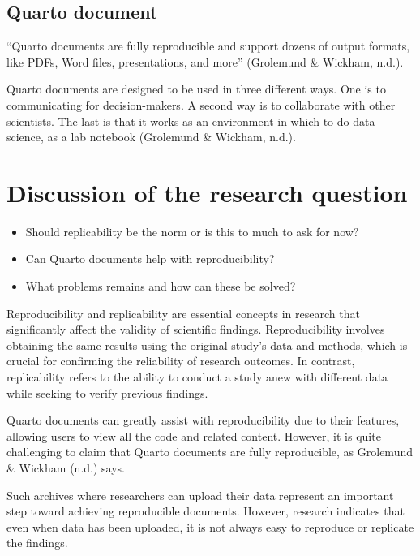 \documentclass[
  a4paper,
]{article}
\providecommand{\tightlist}{%
  \setlength{\itemsep}{0pt}\setlength{\parskip}{0pt}}\usepackage{longtable,booktabs,array}
\begin{document}
\subsection{Quarto document}\label{quarto-document}

``Quarto documents are fully reproducible and support dozens of output
formats, like PDFs, Word files, presentations, and more'' (Grolemund \&
Wickham, n.d.).

Quarto documents are designed to be used in three different ways. One is
to communicating for decision-makers. A second way is to collaborate
with other scientists. The last is that it works as an environment in
which to do data science, as a lab notebook (Grolemund \& Wickham,
n.d.).

\section{Discussion of the research
question}\label{discussion-of-the-research-question}

\begin{itemize}
\tightlist
\item
  Should replicability be the norm or is this to much to ask for now?
\item
  Can Quarto documents help with reproducibility?
\item
  What problems remains and how can these be solved?
\end{itemize}

Reproducibility and replicability are essential concepts in research
that significantly affect the validity of scientific findings.
Reproducibility involves obtaining the same results using the original
study's data and methods, which is crucial for confirming the
reliability of research outcomes. In contrast, replicability refers to
the ability to conduct a study anew with different data while seeking to
verify previous findings.

Quarto documents can greatly assist with reproducibility due to their
features, allowing users to view all the code and related content.
However, it is quite challenging to claim that Quarto documents are
fully reproducible, as Grolemund \& Wickham (n.d.) says.

Such archives where researchers can upload their data represent an
important step toward achieving reproducible documents. However,
research indicates that even when data has been uploaded, it is not
always easy to reproduce or replicate the findings.
\end{document}
